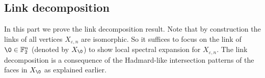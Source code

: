 \subsection{Link decomposition}
In this part we prove the link decomposition result.
%
Note that by construction the links of all vertices $X_{\varepsilon,n}$ are isomorphic. So it suffices to focus on the link of $\0\in \mathbb{F}_2^n$ (denoted by $X_{\0}$) to show local spectral expansion for $X_{\varepsilon,n}$. 
%
The link decomposition is a consequence of the Hadmard-like intersection patterns of the faces in $X_{\0}$ as explained earlier. 
%


